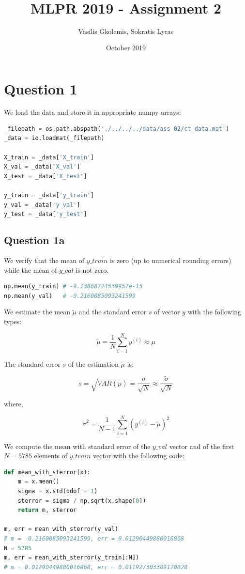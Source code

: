 \documentclass{article}
\title{MLPR 2019 - Assignment 2}
\author{Vasilis Gkolemis, Sokratis Lyras}
\date{October 2019}
\begin{document}
\maketitle

\section*{Question 1}

We load the data and store it in appropriate numpy arrays:

\begin{lstlisting}[language = Python]
_filepath = os.path.abspath('./../../../data/ass_02/ct_data.mat')
_data = io.loadmat(_filepath)

X_train = _data['X_train']
X_val = _data['X_val']
X_test = _data['X_test']

y_train = _data['y_train']
y_val = _data['y_val']
y_test = _data['y_test']
\end{lstlisting}

\subsection*{Question 1a}

We verify that the mean of $y\_train$ is zero (up to numerical rounding errors) while the mean of $y\_val$ is not zero.

\begin{lstlisting}[language = Python]
np.mean(y_train) # -9.13868774539957e-15
np.mean(y_val)   # -0.2160085093241599
\end{lstlisting}


We estimate the mean $\tilde{\mu}$ and the standard error $s$ of vector $y$ with the following types:

$$ \displaystyle \tilde{\mu} = \frac{1}{N} \sum_{i=1}^{N} y^{(i)} \approx \mu $$

The standard error $s$ of the estimation $\tilde{\mu}$ is:

$$ s = \sqrt{VAR(\tilde{\mu})} = 
\displaystyle \frac{\sigma}{\sqrt{N}} 
\approx \displaystyle \frac{\tilde{\sigma}}{\sqrt{N}}$$ 

where,

$$ \displaystyle \tilde{\sigma}^2 = \frac{1}{N-1} \sum_{i=1}^{N} (y^{(i)} - \tilde{\mu})^2 $$


We compute the mean with standard error of the $y\_val$ vector and of the first $N = 5785$ elements of $y\_train$ vector with the following code:

\begin{lstlisting}[language = Python]
def mean_with_sterror(x):
    m = x.mean()
    sigma = x.std(ddof = 1)
    sterror = sigma / np.sqrt(x.shape[0])
    return m, sterror

m, err = mean_with_sterror(y_val)
# m = -0.2160085093241599, err = 0.01290449880016868
N = 5785
m, err = mean_with_sterror(y_train[:N])
# m = 0.01290449880016868, err = 0.011927303389170828
\end{lstlisting}
\end{document}
